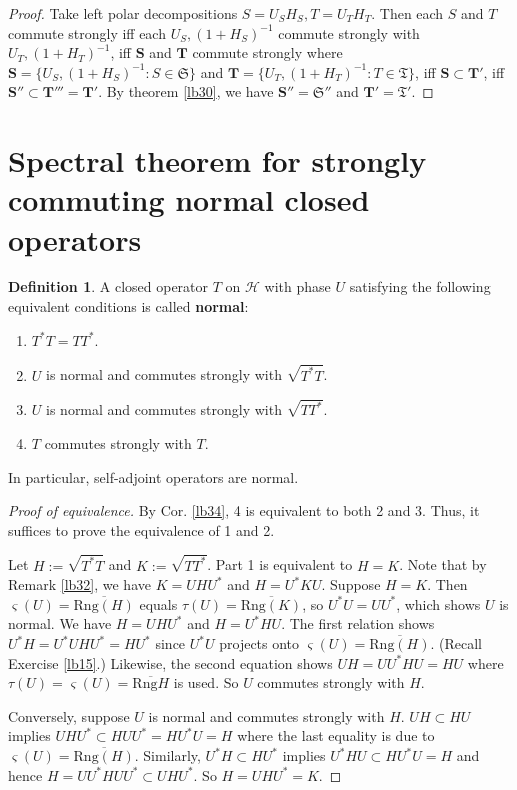 \documentclass[12pt,a4paper,notitlepage]{article}
\theoremstyle{definition}
\newtheorem{df}{Definition}[section]
\theoremstyle{plain}
\newcommand{\fk}{\mathfrak}
\newcommand{\mc}{\mathcal}
\newcommand{\ovl}{\overline}
\newcommand{\sgm}{\varsigma}
\newcommand{\mbf}{\mathbf}
\newcommand{\Rng}{\mathrm{Rng}}
\numberwithin{equation}{section}
\begin{document}
\begin{proof}
Take left polar decompositions $S=U_SH_S,T=U_TH_T$. Then each $S$ and $T$ commute strongly iff each $U_S,(1+H_S)^{-1}$ commute strongly with $U_T,(1+H_T)^{-1}$, iff $\mbf S$ and $\mbf T$ commute strongly where $\mbf S=\{U_S,(1+H_S)^{-1}:S\in\fk S\}$ and $\mbf T=\{U_T,(1+H_T)^{-1}:T\in\fk T\}$, iff $\mbf S\subset\mbf T'$, iff $\mbf S''\subset\mbf T'''=\mbf T'$. By theorem \ref{lb30}, we have $\mbf S''=\fk S''$ and $\mbf T'=\fk T'$.
\end{proof}









\section{Spectral theorem for strongly commuting normal closed operators}\label{lb66}


\begin{df}\label{lb52}
A closed operator $T$ on $\mc H$ with phase $U$ satisfying the following equivalent conditions is called \textbf{normal}:
\begin{enumerate}
\item $T^*T=TT^*$.
\item $U$ is normal and commutes strongly with $\sqrt{T^*T}$. 
\item $U$ is normal and commutes strongly with $\sqrt{TT^*}$. 
\item $T$ commutes strongly with $T$.
\end{enumerate}
\end{df}

In particular, self-adjoint operators are normal.


\begin{proof}[Proof of equivalence]
By Cor. \ref{lb34}, 4 is equivalent to both 2 and 3. Thus, it suffices to prove the equivalence of 1 and 2. 

Let $H:=\sqrt {T^*T}$ and $K:=\sqrt{TT^*}$. Part 1 is equivalent to $H=K$. Note that by Remark \ref{lb32}, we have $K=UHU^*$ and $H=U^*KU$. Suppose $H=K$. Then $\sgm(U)=\ovl{\Rng(H)}$ equals $\tau(U)=\ovl{\Rng(K)}$, so $U^*U=UU^*$, which shows $U$ is normal. We have $H=UHU^*$ and $H=U^*HU$. The first relation shows $U^*H=U^*UHU^*=HU^*$ since $U^*U$ projects onto $\sgm(U)=\ovl{\Rng(H)}$. (Recall Exercise \ref{lb15}.) Likewise, the second equation shows $UH=UU^*HU=HU$ where $\tau(U)=\sgm(U)=\ovl{\Rng H}$ is used. So $U$ commutes strongly with $H$. 

Conversely, suppose $U$ is normal and commutes strongly with $H$. $UH\subset HU$ implies $UHU^*\subset HUU^*=HU^*U=H$ where the last equality is due to $\sgm(U)=\ovl{\Rng(H)}$. Similarly, $U^*H\subset HU^*$ implies $U^*HU\subset HU^*U=H$ and hence $H=UU^*HUU^*\subset UHU^*$. So $H=UHU^*=K$.
\end{proof}
\end{document}
